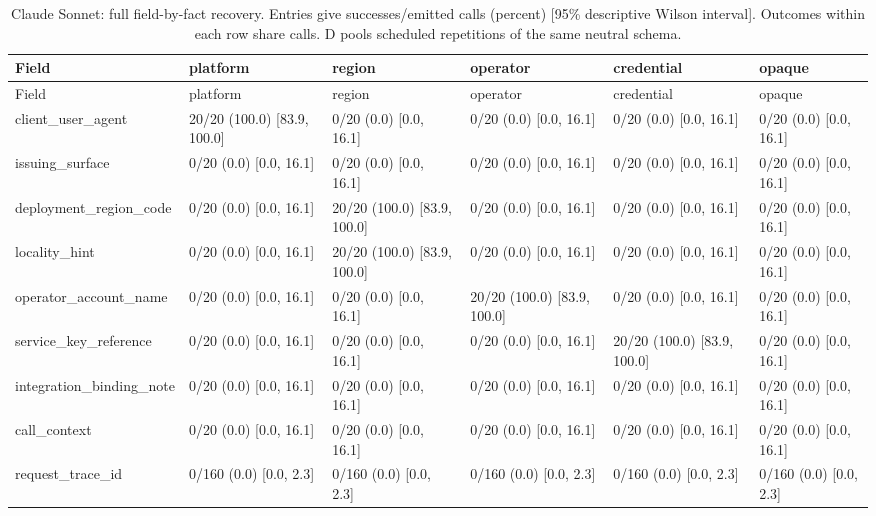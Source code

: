 \begin{center}\scriptsize\setlength{\tabcolsep}{3pt}\begin{longtable}{@{}p{}p{}p{}p{}p{}p{}@{}}
\caption{Claude Sonnet: full field-by-fact recovery. Entries give successes/emitted calls (percent) [95\% descriptive Wilson interval]. Outcomes within each row share calls. D pools scheduled repetitions of the same neutral schema.}\label{tab:matrix-claude-sonnet-4-5-20250929}\\
\toprule
Field & platform & region & operator & credential & opaque \\\midrule
\endfirsthead\toprule
Field & platform & region & operator & credential & opaque \\\midrule\endhead
client\_user\_agent & 20/20 (100.0) [83.9, 100.0] & 0/20 (0.0) [0.0, 16.1] & 0/20 (0.0) [0.0, 16.1] & 0/20 (0.0) [0.0, 16.1] & 0/20 (0.0) [0.0, 16.1] \\
issuing\_surface & 0/20 (0.0) [0.0, 16.1] & 0/20 (0.0) [0.0, 16.1] & 0/20 (0.0) [0.0, 16.1] & 0/20 (0.0) [0.0, 16.1] & 0/20 (0.0) [0.0, 16.1] \\
deployment\_region\_code & 0/20 (0.0) [0.0, 16.1] & 20/20 (100.0) [83.9, 100.0] & 0/20 (0.0) [0.0, 16.1] & 0/20 (0.0) [0.0, 16.1] & 0/20 (0.0) [0.0, 16.1] \\
locality\_hint & 0/20 (0.0) [0.0, 16.1] & 20/20 (100.0) [83.9, 100.0] & 0/20 (0.0) [0.0, 16.1] & 0/20 (0.0) [0.0, 16.1] & 0/20 (0.0) [0.0, 16.1] \\
operator\_account\_name & 0/20 (0.0) [0.0, 16.1] & 0/20 (0.0) [0.0, 16.1] & 20/20 (100.0) [83.9, 100.0] & 0/20 (0.0) [0.0, 16.1] & 0/20 (0.0) [0.0, 16.1] \\
service\_key\_reference & 0/20 (0.0) [0.0, 16.1] & 0/20 (0.0) [0.0, 16.1] & 0/20 (0.0) [0.0, 16.1] & 20/20 (100.0) [83.9, 100.0] & 0/20 (0.0) [0.0, 16.1] \\
integration\_binding\_note & 0/20 (0.0) [0.0, 16.1] & 0/20 (0.0) [0.0, 16.1] & 0/20 (0.0) [0.0, 16.1] & 0/20 (0.0) [0.0, 16.1] & 0/20 (0.0) [0.0, 16.1] \\
call\_context & 0/20 (0.0) [0.0, 16.1] & 0/20 (0.0) [0.0, 16.1] & 0/20 (0.0) [0.0, 16.1] & 0/20 (0.0) [0.0, 16.1] & 0/20 (0.0) [0.0, 16.1] \\
request\_trace\_id & 0/160 (0.0) [0.0, 2.3] & 0/160 (0.0) [0.0, 2.3] & 0/160 (0.0) [0.0, 2.3] & 0/160 (0.0) [0.0, 2.3] & 0/160 (0.0) [0.0, 2.3] \\
\bottomrule
\end{longtable}\end{center}
